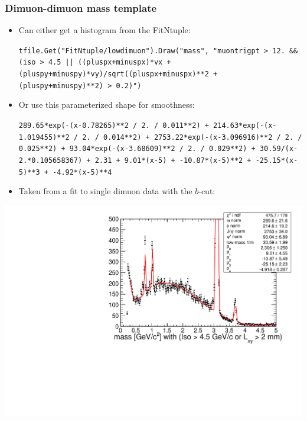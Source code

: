 \documentclass[compress]{beamer}
\begin{document}
\begin{frame}
\frametitle{Dimuon-dimuon mass template}

\begin{itemize}
\item Can either get a histogram from the FitNtuple:

{\tt \tiny tfile.Get("FitNtuple/lowdimuon").Draw("mass", "muontrigpt > 12. \&\& (iso > 4.5 || ((pluspx+minuspx)*vx + (pluspy+minuspy)*vy)/sqrt((pluspx+minuspx)**2 + (pluspy+minuspy)**2) > 0.2)")}

\item Or use this parameterized shape for smoothness:

{\tt \tiny 289.65*exp(-(x-0.78265)**2 / 2. / 0.011**2) + 214.63*exp(-(x-1.019455)**2 / 2. / 0.014**2) + 2753.22*exp(-(x-3.096916)**2 / 2. / 0.025**2) + 93.04*exp(-(x-3.68609)**2 / 2. / 0.029**2) + 30.59/(x-2.*0.105658367) + 2.31 + 9.01*(x-5) + -10.87*(x-5)**2 + -25.15*(x-5)**3 + -4.92*(x-5)**4}

\item Taken from a fit to single dimuon data with the $b$-cut:
\end{itemize}
\begin{center}
\includegraphics[width=0.5\linewidth]{lowdimuon_mass_bcuts_backgroundfit_zoom.pdf}
\end{center}
\end{frame}
\end{document}
